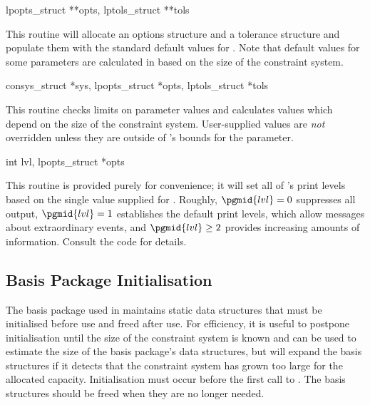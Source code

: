 \begin{subrdoc}
  \item
	  {lpopts_struct **opts, lptols_struct **tols}
  
  This routine will allocate an options structure  and a
  tolerance structure  and populate them with the standard
  default values for \dylp.
  Note that default values for some parameters are calculated
  in 
  based on the size of the constraint system.

  \item
	  {consys_struct *sys, lpopts_struct *opts, lptols_struct *tols}
  
  This routine checks limits on parameter values and calculates
  values which depend on the size of the constraint system.
  User-supplied values are \textit{not} overridden unless they are outside
  of \dylp's bounds for the parameter.

  \item
	  {int lvl, lpopts_struct *opts}

  This routine is provided purely for convenience; it will set all of
  \dylp's print levels based on the single value supplied for .
  Roughly, $\pgmid{lvl} = 0$ suppresses all output,
  $\pgmid{lvl} = 1$ establishes the default print levels, which allow
  messages about extraordinary events, and
  $\pgmid{lvl} \geq 2$ provides increasing amounts of information.
  Consult the code for details.
\end{subrdoc}

\subsection{Basis Package Initialisation}
\label{sec:GLPKBasisInit}

The \glpk basis package used in \dylp maintains static data structures that
must be initialised before use and freed after use.
For efficiency, it is useful to postpone initialisation until the size of the
constraint system is known and can be used to estimate the size of the basis
package's data structures, but \dylp will expand the basis structures if it
detects that the constraint system has grown too large for the allocated
capacity.
Initialisation must occur before the first call to .
The basis structures should be freed when they are no longer needed.

